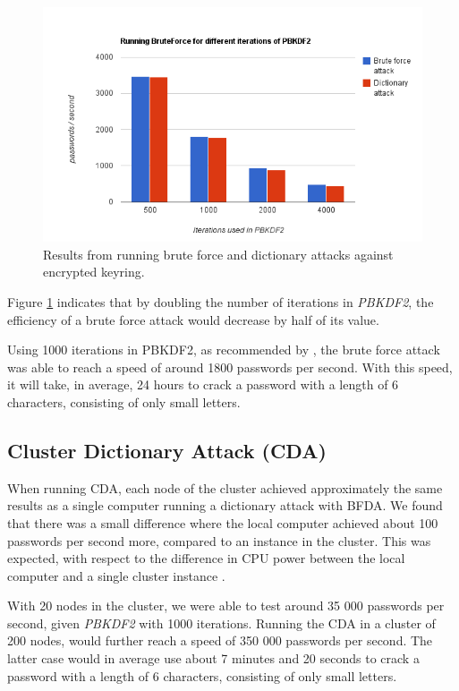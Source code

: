 \documentclass[pdftex,english,10pt,b5paper,twoside]{book}
\begin{document}
\begin{figure}[!h]
\centering
\includegraphics[scale=0.55]{bf.png}
\caption{Results from running brute force and dictionary attacks against encrypted keyring.}
\label{fig:bfres}
\end{figure}

Figure \ref{fig:bfres} indicates that by doubling the number of iterations in
\emph{PBKDF2}, the efficiency of a brute force attack would decrease by half of
its value.

Using 1000 iterations in \ac{PBKDF2}, as recommended by \citet{pbkdf2std}, the
brute force attack was able to reach a speed of around 1800 passwords per
second. With this speed, it will take, in average, 24 hours to crack a password
with a length of 6 characters, consisting of only small letters.

\subsection{Cluster Dictionary Attack (CDA)}

When running \ac{CDA}, each node of the cluster achieved approximately the same
results as a single computer running a dictionary attack with \ac{BFDA}. We
found that there was a small difference where the local computer achieved about
100 passwords per second more, compared to an instance in the cluster. This was
expected, with respect to the difference in \ac{CPU} power between the local
computer and a single cluster instance \cite{cpubench}. 

With 20 nodes in the cluster, we were able to test around 35 000 passwords per
second, given \emph{PBKDF2} with 1000 iterations. Running the \ac{CDA} in a
cluster of 200 nodes, would further reach a speed of 350 000 passwords per
second. The latter case would in average use about 7 minutes and 20 seconds to
crack a password with a length of 6 characters, consisting of only small
letters.
\end{document}
